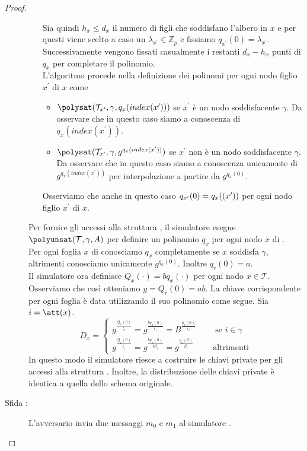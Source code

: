 \begin{thm}
\begin{proof}
\begin{description}
\begin{itemize}
Sia quindi $h_x \leq d_x$ il numero di figli che soddisfano l'albero in $x$ e per questi viene scelto a caso un $\lambda_{x^\prime} \in \mathbb{Z}_p$ e fissiamo $q_{x^\prime}(0) = \lambda_{x^\prime}$. Successivamente vengono fissati casualmente i restanti $d_x - h_x$ punti di $q_x$ per completare il polinomio.\\
L'algoritmo procede nella definizione dei polinomi per ogni nodo figlio $x^\prime$ di $x$ come
\begin{itemize}
\item $\polysat(\mathcal{T}_{x^\prime} , \gamma , q_x(index(x^\prime)))$ se $x^\prime$ è un nodo soddisfacente $\gamma$. Da osservare che in questo caso siamo a conoscenza di $q_x(index(x^\prime))$.
\item $\polysat(\mathcal{T}_{x^\prime} , \gamma , g^{q_x(index(x^\prime))})$ se $x^\prime$ non è un nodo soddisfacente $\gamma$. Da osservare che in questo caso siamo a conoscenza unicamente di $g^{q_x(index(x^\prime))}$ per interpolazione a partire da $g^{q_x(0)}$.
\end{itemize}
Osserviamo che anche in questo caso $q_{x^\prime}(0) = q_x(\index (x^\prime))$ per ogni nodo figlio $x^\prime$ di $x$.
\end{itemize}
Per fornire gli accessi alla struttura , il simulatore esegue $\polyunsat(\mathcal{T},\gamma,A)$ per definire un polinomio $q_x$ per ogni nodo $x$ di .\\
Per ogni foglia $x$ di  conosciamo $q_x$ completamente se $x$ soddisfa $\gamma$, altrimenti conosciamo unicamente $g^{q_x(0)}$. Inoltre $q_r(0) = a$.\\
Il simulatore ora definisce $Q_x(\cdot) = b q_x( \cdot)$ per ogni nodo $x \in \mathcal{T}$. Osserviamo che così otteniamo $y = Q_r(0) = ab$. La chiave corrispondente per ogni foglia è data utilizzando il suo polinomio come segue. Sia $i = \att(x)$.
\[ D_x = \begin{cases}
g^{\frac{Q_x(0)}{t_i}} = g^{\frac{b q_x(0)}{r_i}} = B^{\frac{q_x(0)}{r_i}}  \qquad \text{ se } i \in \gamma\\
g^{\frac{Q_x(0)}{t_i}} = g^{\frac{b q_x(0)}{b \beta_i}} = g^{\frac{q_x(0)}{\beta_i}} \qquad \text{ altrimenti}
\end{cases} \]
In questo modo il simulatore  riesce a costruire le chiavi private per gli accessi alla struttura . Inoltre, la distribuzione delle chiavi private è identica a quella dello schema originale.
\item[Sfida :] L'avversario  invia due messaggi $m_0$ e $m_1$ al simulatore .\\

\end{description}
\end{proof}
\end{thm}
